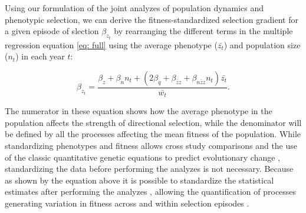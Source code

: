 \documentclass{article}
\begin{document}
Using our formulation of the joint analyzes of population dynamics and phenotypic selection, we can derive the fitness-standardized selection gradient for a given episode of slection $\beta_{z_{t}}$ by rearranging the different terms in the multiple regression equation \ref{eq: full} using the average phenotype ($\bar{z_t}$) and population size ($n_t$) in each year $t$:

\begin{equation}
\beta_{z_{t}}=\frac{\beta_{z} +  \beta_{n}n_t + (2\beta_{q}+ \beta_{\bar{z}z} +  \beta_{n\bar{z}z}n_t)\bar{z_t}}{\bar{w_{t}}} .
\end{equation}

\noindent The numerator in these equation shows how the average phenotype in the population affects the strength of directional selection, while the denominator will be defined by all the processes affecting the mean fitness of the population. While standardizing phenotypes and fitness allows cross study comparisons and the use of the classic quantitative genetic equations to predict evolutionary change \citep{Lande1983}, standardizing the data before performing the analyzes is not necessary. Because as shown by the equation above it is possible to standardize the statistical estimates after performing the analyzes \citep{Dingemanse2021}, allowing the quantification of processes generating variation in fitness across and within selection episodes .  
\bigskip
\end{document}
